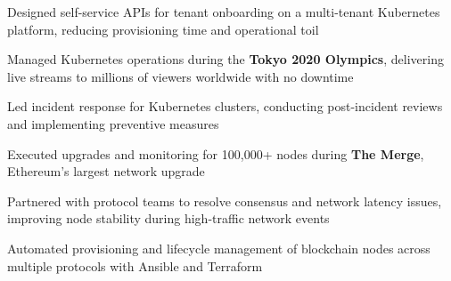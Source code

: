 \documentclass[]{willianpaixao-resume}
\begin{document}
\begin{minipage}[t]{0.68\textwidth}

\begin{tightemize}
\item Designed self-service APIs for tenant onboarding on a multi-tenant Kubernetes platform, reducing provisioning time and operational toil
\item Managed Kubernetes operations during the \textbf{Tokyo 2020 Olympics}, delivering live streams to millions of viewers worldwide with no downtime
\item Led incident response for Kubernetes clusters, conducting post-incident reviews and implementing preventive measures
\end{tightemize}
\sectionsep

\begin{tightemize}
\item Executed upgrades and monitoring for 100,000+ nodes during \textbf{The Merge}, Ethereum's largest network upgrade
\item Partnered with protocol teams to resolve consensus and network latency issues, improving node stability during high-traffic network events
\item Automated provisioning and lifecycle management of blockchain nodes across multiple protocols with Ansible and Terraform
\end{tightemize}


\end{minipage}
\end{document}
